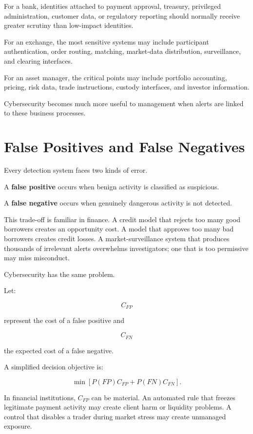 For a bank, identities attached to payment approval, treasury, privileged administration, customer data, or regulatory reporting should normally receive greater scrutiny than low-impact identities.

For an exchange, the most sensitive systems may include participant authentication, order routing, matching, market-data distribution, surveillance, and clearing interfaces.

For an asset manager, the critical points may include portfolio accounting, pricing, risk data, trade instructions, custody interfaces, and investor information.

Cybersecurity becomes much more useful to management when alerts are linked to these business processes.

\section{False Positives and False Negatives}

Every detection system faces two kinds of error.

A \textbf{false positive} occurs when benign activity is classified as suspicious.

A \textbf{false negative} occurs when genuinely dangerous activity is not detected.

This trade-off is familiar in finance. A credit model that rejects too many good borrowers creates an opportunity cost. A model that approves too many bad borrowers creates credit losses. A market-surveillance system that produces thousands of irrelevant alerts overwhelms investigators; one that is too permissive may miss misconduct.

Cybersecurity has the same problem.

Let:

\[
C_{FP}
\]

represent the cost of a false positive and

\[
C_{FN}
\]

the expected cost of a false negative.

A simplified decision objective is:

\begin{equation}
\min \left[
P(FP)C_{FP}
+
P(FN)C_{FN}
\right].
\end{equation}

In financial institutions, \(C_{FP}\) can be material. An automated rule that freezes legitimate payment activity may create client harm or liquidity problems. A control that disables a trader during market stress may create unmanaged exposure.

